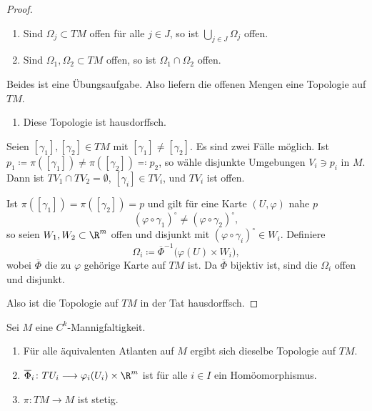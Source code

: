 \documentclass[11pt]{article}
\begin{document}
\begin{proof}
  \begin{enumerate}[label=(\arabic*)]
    \item Sind $\Omega_j \subset TM$ offen für alle $j \in J$, so ist $\bigcup_{j \in J} \Omega_j$ offen.
    \item Sind $\Omega_1, \Omega_2 \subset TM$ offen, so ist $\Omega_1 \cap \Omega_2$ offen.
  \end{enumerate}
  Beides ist eine Übungsaufgabe. Also liefern die offenen Mengen eine Topologie auf $TM$.
  \begin{enumerate}[label=(\arabic*), resume]
    \item Diese Topologie ist hausdorffsch.
  \end{enumerate}
  Seien $[\gamma_1], [\gamma_2] \in TM$ mit $[\gamma_1] \neq [\gamma_2]$. Es sind zwei Fälle möglich.
Ist $p_1 \coloneqq \pi([\gamma_1]) \neq \pi([\gamma_2]) \eqqcolon p_2$, so wähle disjunkte Umgebungen $V_i \ni p_i$ in $M$. Dann ist $TV_1 \cap TV_2 = \emptyset$, $[\gamma_i] \in TV_i$, und $TV_i$ ist offen.




  Ist $\pi([\gamma_1]) = \pi([\gamma_2]) = p$ und gilt für eine Karte $(U, \varphi)$ nahe $p$
  \[ (\varphi \circ \gamma_1)^{\circ} \neq (\varphi \circ \gamma_2)^{\circ}, \]
  so seien $W_1, W_2 \subset \R^m$ offen und disjunkt mit $(\varphi \circ \gamma_i)^{\circ} \in W_i$. Definiere
  \[ \Omega_i \coloneqq \overline{\Phi}^{-1}\bigl(\varphi(U) \times W_i\bigr), \]
  wobei $\overline{\Phi}$ die zu $\varphi$ gehörige Karte auf $TM$ ist. Da $\overline{\Phi}$ bijektiv ist, sind die $\Omega_i$ offen und disjunkt.

  Also ist die Topologie auf $TM$ in der Tat hausdorffsch.
\end{proof}


\begin{proposition}\Theorem
  Sei $M$ eine $C^k$-Mannigfaltigkeit.
  \begin{enumerate}[label=(\roman*)]
    \item Für alle äquivalenten Atlanten auf $M$ ergibt sich dieselbe Topologie auf $TM$.
    \item $\overline{\Phi}_i \colon TU_i \longrightarrow \varphi_i(U_i) \times \R^m$ ist für alle $i \in I$ ein Homöomorphismus.
    \item $\pi \colon TM \to M$ ist stetig.
  \end{enumerate}
\end{proposition}
\end{document}
